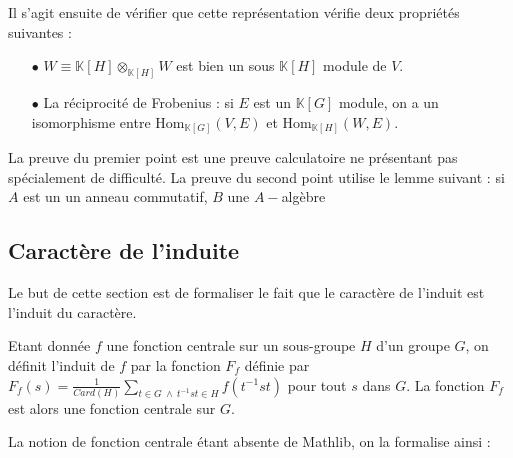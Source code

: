 \documentclass[10pt]{article}
\theoremstyle{definition}
\begin{document}
 Il s'agit ensuite de vérifier que cette représentation vérifie deux propriétés suivantes : 
 \begin{itemize}
 	\item [$\bullet$] $W\equiv\mathbb{K}[H]\otimes_{\mathbb{K}[H]}W$ est bien un sous $\mathbb{K}[H]$ module de $V$.
 	\item[$\bullet$] La réciprocité de Frobenius : si $E$ est un $\mathbb{K}[G]$ module, on a un isomorphisme entre $\text{Hom}_{\mathbb{K}[G]}(V,E)$ et $\text{Hom}_{\mathbb{K}[H]}(W,E)$.
 \end{itemize}

La preuve du premier point est une preuve calculatoire ne présentant pas spécialement de difficulté.
La preuve du second point utilise le lemme suivant : si $A$ est un un anneau commutatif, $B$ une $A-$algèbre 

 
\subsection{Caractère de l'induite}
Le but de cette section est de formaliser le fait que \og le caractère de l'induit est l'induit du caractère\fg.
\newline

Etant donnée $f$ une fonction centrale sur un sous-groupe $H$ d'un groupe $G$, on définit l'induit de $f$ par la fonction $F_f$ définie par $F_f(s)=\frac{1}{Card(H)}\sum\limits_{t\in G \ \wedge \ t^{-1}st\in H}f(t^{-1}st)$ pour tout $s$ dans $G$. La fonction $F_f$ est alors une fonction centrale sur $G$.
\newline

La notion de fonction centrale étant absente de Mathlib, on la formalise ainsi : 
\end{document}
